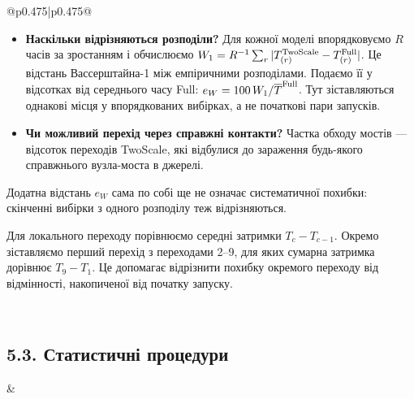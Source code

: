 \documentclass[11pt]{article}
\newcommand{\Full}{\textnormal{Full}}
\newcommand{\TS}{\textnormal{TwoScale}}
\newcommand{\eW}{e_W}
\begin{document}
\begin{longtable}{@{}p{0.475\textwidth}|p{0.475\textwidth}@{}}
\begin{minipage}[t]{\linewidth}
\begin{itemize}
\item \textbf{Наскільки відрізняються розподіли?} Для кожної моделі впорядковуємо $R$ часів за зростанням і обчислюємо $W_1=R^{-1}\sum_r|T^{\TS}_{(r)}-T^{\Full}_{(r)}|$. Це відстань Вассерштайна-1 між емпіричними розподілами. Подаємо її у відсотках від середнього часу \Full{}: $\eW=100\,W_1/\overline{T}^{\Full}$. Тут зіставляються однакові місця у впорядкованих вибірках, а не початкові пари запусків.
\item \textbf{Чи можливий перехід через справжні контакти?} Частка обходу мостів --- відсоток переходів \TS{}, які відбулися до зараження будь-якого справжнього вузла-моста в джерелі.
\end{itemize}
Додатна відстань $\eW$ сама по собі ще не означає систематичної похибки: скінченні вибірки з одного розподілу теж відрізняються.
\par Для локального переходу порівнюємо середні затримки $T_c-T_{c-1}$. Окремо зіставляємо перший перехід з переходами 2--9, для яких сумарна затримка дорівнює $T_9-T_1$. Це допомагає відрізнити похибку окремого переходу від відмінності, накопиченої від початку запуску.
\end{minipage} \\[5mm]
\begin{minipage}[t]{\linewidth}
\subsection*{5.3. Статистичні процедури}
\end{minipage} &
\begin{minipage}[t]{\linewidth}

\end{minipage}
\end{longtable}
\end{document}
